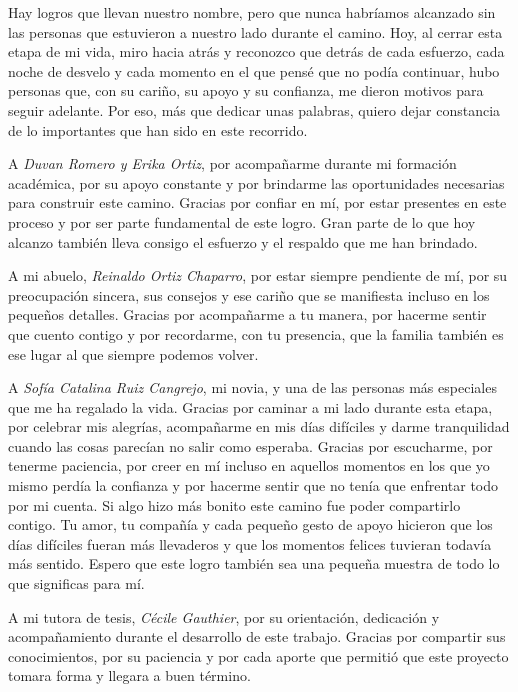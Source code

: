 \documentclass[12pt,letterpaper,oneside]{article}
\newcommand{\autorUno}{Juan Felipe Romero Ortiz}
\begin{document}
\noindent{\bfseries \autorUno:}
\vspace{0.3cm}

Hay logros que llevan nuestro nombre, pero que nunca habríamos alcanzado sin las personas que estuvieron a nuestro lado durante el camino. Hoy, al cerrar esta etapa de mi vida, miro hacia atrás y reconozco que detrás de cada esfuerzo, cada noche de desvelo y cada momento en el que pensé que no podía continuar, hubo personas que, con su cariño, su apoyo y su confianza, me dieron motivos para seguir adelante. Por eso, más que dedicar unas palabras, quiero dejar constancia de lo importantes que han sido en este recorrido.

A \textit{Duvan Romero y Erika Ortiz}, por acompañarme durante mi formación académica, por su apoyo constante y por brindarme las oportunidades necesarias para construir este camino. Gracias por confiar en mí, por estar presentes en este proceso y por ser parte fundamental de este logro. Gran parte de lo que hoy alcanzo también lleva consigo el esfuerzo y el respaldo que me han brindado.

A mi abuelo, \textit{Reinaldo Ortiz Chaparro}, por estar siempre pendiente de mí, por su preocupación sincera, sus consejos y ese cariño que se manifiesta incluso en los pequeños detalles. Gracias por acompañarme a tu manera, por hacerme sentir que cuento contigo y por recordarme, con tu presencia, que la familia también es ese lugar al que siempre podemos volver.

A \textit{Sofía Catalina Ruiz Cangrejo}, mi novia, y una de las personas más especiales que me ha regalado la vida. Gracias por caminar a mi lado durante esta etapa, por celebrar mis alegrías, acompañarme en mis días difíciles y darme tranquilidad cuando las cosas parecían no salir como esperaba. Gracias por escucharme, por tenerme paciencia, por creer en mí incluso en aquellos momentos en los que yo mismo perdía la confianza y por hacerme sentir que no tenía que enfrentar todo por mi cuenta. Si algo hizo más bonito este camino fue poder compartirlo contigo. Tu amor, tu compañía y cada pequeño gesto de apoyo hicieron que los días difíciles fueran más llevaderos y que los momentos felices tuvieran todavía más sentido. Espero que este logro también sea una pequeña muestra de todo lo que significas para mí.

A mi tutora de tesis, \textit{Cécile Gauthier}, por su orientación, dedicación y acompañamiento durante el desarrollo de este trabajo. Gracias por compartir sus conocimientos, por su paciencia y por cada aporte que permitió que este proyecto tomara forma y llegara a buen término.
\end{document}
